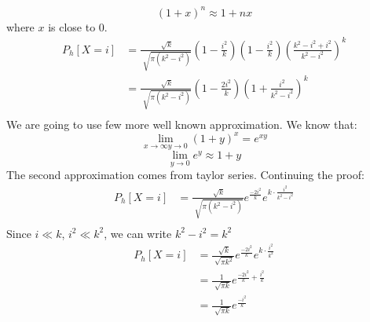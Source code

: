 \begin{solution}
	\[(1+x)^n \approx 1+nx\]
	where $x$ is close to 0.
	\begin{align}
		P_h[X=i] & = \frac{\sqrt[]{k}}{\sqrt[]{\pi (k^2-i^2)}}\left(1-\frac{i^2}{k}\right)\left(1-\frac{i^2}{k}\right)\left(\frac{k^2-i^2+i^2}{k^2-i^2}\right)^k\\
		& = \frac{\sqrt[]{k}}{\sqrt[]{\pi (k^2-i^2)}}\left(1-\frac{2i^2}{k}\right)\left(1+\frac{i^2}{k^2-i^2}\right)^k\\
	\end{align}
	We are going to use few more well known approximation. We know that:
	\[\lim_{x\to \infty y\to 0} (1+y)^x = e^{xy}\]
	\[\lim_{y\to 0}e^y \approx 1+y\]
	The second approximation comes from taylor series.
	Continuing the proof:
	\begin{align}
		P_h[X=i] & = \frac{\sqrt[]{k}}{\sqrt[]{\pi (k^2-i^2)}} e^{\frac{-2i^2}{k}}e^{k\cdot{\frac{i^2}{k^2-i^2}}}\\
	\end{align}
	Since $i\ll k$, $i^2 \ll k^2$, we can write $k^2-i^2=k^2$
	\begin{align}
		P_h[X=i] & = \frac{\sqrt[]{k}}{\sqrt[]{\pi k^2}}e^{\frac{-2i^2}{k}}e^{k\cdot{\frac{i^2}{k^2}}} \\
		& = \frac{1}{\sqrt[]{\pi k}}e^{\frac{-2i^2}{k}+\frac{i^2}{k}}\\
		& = \frac{1}{\sqrt[]{\pi k}}e^{\frac{-i^2}{k}}
	\end{align}
	
\end{solution}
